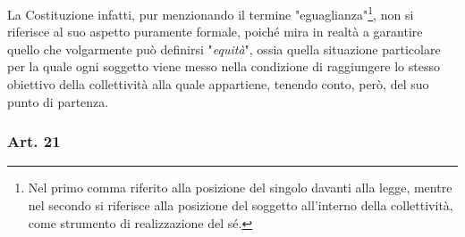 La Costituzione infatti, pur menzionando il termine "eguaglianza"\footnote{Nel primo comma riferito alla posizione del singolo davanti alla legge, mentre nel secondo si riferisce alla posizione del soggetto all'interno della collettività, come strumento di realizzazione del sé.}, non si riferisce al suo aspetto puramente formale, poiché mira in realtà a garantire quello che volgarmente può definirsi "\textit{equità}", ossia quella situazione particolare per la quale ogni soggetto viene messo nella condizione di raggiungere lo stesso obiettivo della collettività alla quale appartiene, tenendo conto, però, del suo punto di partenza.






\subsubsection{Art. 21}


